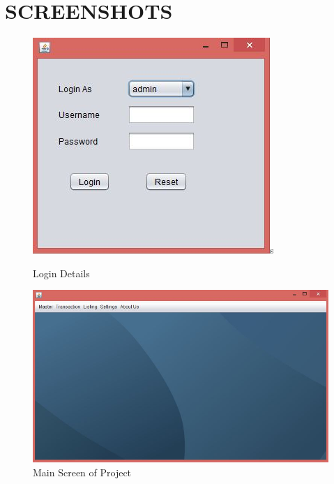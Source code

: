 






\section{SCREENSHOTS}

\begin{figure}[ht]
\begin{center}
\includegraphics[scale=0.5]{images/image13.jpeg}s
\end{center}
\caption{Login Details}
\label{Login Details}
\end{figure}
 
\begin{figure}[ht]
\begin{center}
\includegraphics[scale=0.5]{images/image14.jpeg}
\end{center}
\caption{Main Screen of Project}
\label{Main Screen of Project}
\end{figure}

